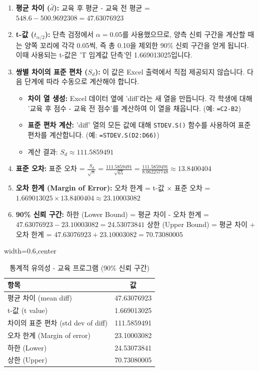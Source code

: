 \documentclass[11pt,a4paper]{book}
\theoremstyle{definition}
\begin{document}
\begin{enumerate}
    \item \textbf{평균 차이 ($\bar{d}$):}
    교육 후 평균 - 교육 전 평균 = $548.6 - 500.9692308 = 47.63076923$
    \item \textbf{t-값 ($t_{\alpha/2}$):}
    단측 검정에서 $\alpha = 0.05$를 사용했으므로, 양측 신뢰 구간을 계산할 때는 양쪽 꼬리에 각각 0.05씩, 즉 총 0.10을 제외한 90\% 신뢰 구간을 얻게 됩니다. 이때 사용되는 t-값은 'T 임계값 단측'인 1.669013025입니다.
    \item \textbf{쌍별 차이의 표준 편차 ($S_d$):}
    이 값은 Excel 출력에서 직접 제공되지 않습니다. 다음 단계에 따라 수동으로 계산해야 합니다.
    \begin{itemize}
        \item \textbf{차이 열 생성:} Excel 데이터 옆에 'diff'라는 새 열을 만듭니다. 각 학생에 대해 '교육 후 점수 - 교육 전 점수'를 계산하여 이 열을 채웁니다. (예: \texttt{=C2-B2})
        \item \textbf{표준 편차 계산:} 'diff' 열의 모든 값에 대해 \texttt{STDEV.S()} 함수를 사용하여 표준 편차를 계산합니다. (예: \texttt{=STDEV.S(D2:D66)})
        \item 계산 결과: $S_d \approx 111.5859491$
    \end{itemize}
    \item \textbf{표준 오차:}
    표준 오차 = $\frac{S_d}{\sqrt{n}} = \frac{111.5859491}{\sqrt{65}} = \frac{111.5859491}{8.062257748} \approx 13.8400404$
    \item \textbf{오차 한계 (Margin of Error):}
    오차 한계 = t-값 $\times$ 표준 오차 = $1.669013025 \times 13.8400404 \approx 23.10003082$
    \item \textbf{90\% 신뢰 구간:}
    하한 (Lower Bound) = 평균 차이 - 오차 한계 = $47.63076923 - 23.10003082 = 24.53073841$
    상한 (Upper Bound) = 평균 차이 + 오차 한계 = $47.63076923 + 23.10003082 = 70.73080005$
\end{enumerate}

\begin{table}[h!]
\caption{통계적 유의성 - 교육 프로그램 (90\% 신뢰 구간)}
\label{tab:training_ci}
\centering
\begin{adjustbox}{width=0.6\textwidth,center}
\begin{tabular}{lc}
\toprule
\textbf{항목} & \textbf{값} \\
\midrule
평균 차이 (mean diff) & 47.63076923 \\
t-값 (t value) & 1.669013025 \\
차이의 표준 편차 (std dev of diff) & 111.5859491 \\
오차 한계 (Margin of error) & 23.10003082 \\
하한 (Lower) & 24.53073841 \\
상한 (Upper) & 70.73080005 \\
\bottomrule
\end{tabular}
\end{adjustbox}
\end{table}
\end{document}
